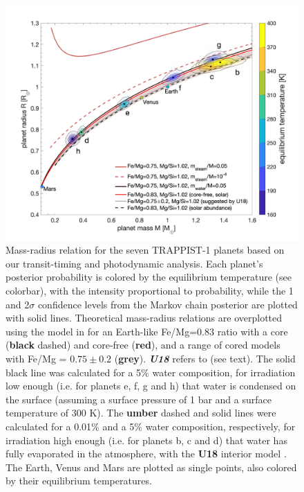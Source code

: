 \documentclass[twocolumn]{aastex63}
\begin{document}
\begin{figure}
    \centering
    \includegraphics[width=\hsize]{figures/Figure_MR_v8.png}
    {Mass-radius relation for the seven TRAPPIST-1 planets based on
        our transit-timing and photodynamic analysis.
        Each planet's posterior probability is colored by the equilibrium temperature
        (see colorbar), with the intensity proportional to probability, while the 1 and 2$\sigma$
        confidence levels from the Markov chain posterior are plotted with solid lines.
        Theoretical mass-radius relations are overplotted using the model in \citet{Dorn2016} for an Earth-like Fe/Mg=0.83 ratio with a core (\textbf{black} dashed) and core-free (\textbf{red}), and a range of cored models with Fe/Mg = $0.75{\pm}0.2$ (\textbf{grey}).  \textbf{{\it U18}} refers to \citet{Unterborn2018a} (see text).
        The solid black line was calculated for a 5$\%$ water composition, for irradiation low enough (i.e. for planets e, f, g and h) that water is condensed on the surface  (assuming a surface pressure of 1 bar and a surface temperature of 300 K). The \textbf{umber} dashed and solid lines were calculated for a 0.01$\%$ and a 5$\%$ water composition, respectively, for irradiation high enough (i.e. for planets b, c and d) that water has fully evaporated in the atmosphere, with the \textbf{U18} interior model \citep{Turbet2020}.
        The Earth, Venus and Mars are plotted as single points, also colored by their equilibrium temperatures.}
    \label{fig:mass_radius_relation}
\end{figure}
\end{document}
